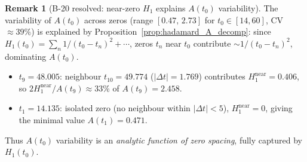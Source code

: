 \documentclass[11pt, a4paper]{article}
\theoremstyle{definition}
\newtheorem{remark}{Remark}[section]
\theoremstyle{plain}
\begin{document}
\begin{remark}[B-20 resolved: near-zero $H_1$ explains $A(t_0)$ variability]
\label{rem:hadamard_B20}
The variability of $A(t_0)$ across zeros (range $[0.47,\,2.73]$ for $t_0\in[14,60]$,
CV$\approx 39\%$) is explained by Proposition~\ref{prop:hadamard_A_decomp}:
since $H_1(t_0) = \sum_n 1/(t_0-t_n)^2 + \cdots$, zeros $t_n$ near $t_0$ contribute
$\sim 1/(t_0-t_n)^2$, dominating $A(t_0)$.
\begin{itemize}
  \item $t_9 = 48.005$: neighbour $t_{10} = 49.774$ ($|\Delta t| = 1.769$) contributes
    $H_1^{\mathrm{near}} = 0.406$, so $2H_1^{\mathrm{near}}/A(t_9) \approx 33\%$
    of $A(t_9) = 2.458$.
  \item $t_1 = 14.135$: isolated zero (no neighbour within $|\Delta t| < 5$),
    $H_1^{\mathrm{near}} = 0$, giving the minimal value $A(t_1) = 0.471$.
\end{itemize}
Thus $A(t_0)$ variability is an \emph{analytic function of zero spacing},
fully captured by $H_1(t_0)$.
\end{remark}
\end{document}
